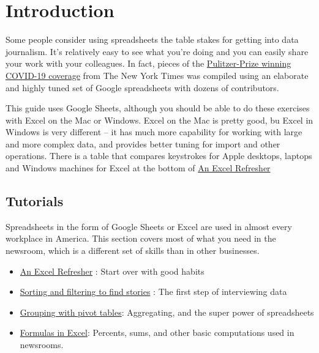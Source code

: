 \documentclass[
  letterpaper,
  DIV=11,
  numbers=noendperiod]{scrreprt}
\begin{document}

\hypertarget{introduction-1}{%
\chapter{Introduction}\label{introduction-1}}

Some people consider using spreadsheets the table stakes for getting
into data journalism. It's relatively easy to see what you're doing and
you can easily share your work with your colleagues. In fact, pieces of
the
\href{https://www.pulitzer.org/winners/new-york-times-6}{Pulitzer-Prize
winning COVID-19 coverage} from The New York Times was compiled using an
elaborate and highly tuned set of Google spreadsheets with dozens of
contributors.

This guide uses Google Sheets, although you should be able to do these
exercises with Excel on the Mac or Windows. Excel on the Mac is pretty
good, bu Excel in Windows is very different -- it has much more
capability for working with large and more complex data, and provides
better tuning for import and other operations. There is a table that
compares keystrokes for Apple desktops, laptops and Windows machines for
Excel at the bottom of \href{xl-refresher}{An Excel Refresher}

\hypertarget{tutorials}{%
\section{Tutorials}\label{tutorials}}

Spreadsheets in the form of Google Sheets or Excel are used in almost
every workplace in America. This section covers most of what you need in
the newsroom, which is a different set of skills than in other
businesses.

\begin{itemize}
\item
  \href{xl-refresher.html}{An Excel Refresher} : Start over with good
  habits
\item
  \href{xl-filter-sort.html}{Sorting and filtering to find stories} :
  The first step of interviewing data
\item
  \href{xl-pivot.html}{Grouping with pivot tables}: Aggregating, and the
  super power of spreadsheets
\item
  \href{xl-formulas.html}{Formulas in Excel}: Percents, sums, and other
  basic computations used in newsrooms.
\end{itemize}
\end{document}
